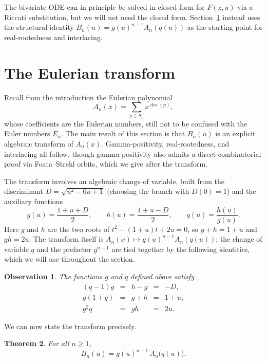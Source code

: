 \documentclass[10pt]{article}
\theoremstyle{plain}
\newtheorem{theorem}{Theorem}[section]
\newtheorem{observation}[theorem]{Observation}
\DeclareMathOperator{\des}{des}
\begin{document}
The bivariate ODE can in principle be solved in closed form for $F(z,u)$ via a Riccati substitution, but we will not need the closed form. Section~\ref{sec:transform} instead uses the structural identity $B_n(u) = g(u)^{n-1} A_n(q(u))$ as the starting point for real-rootedness and interlacing.


\section{The Eulerian transform}
\label{sec:transform}

Recall from the introduction the Eulerian polynomial
\[
	A_n(x) = \sum_{p \in S_n} x^{\des(p)},
\]
whose coefficients are the Eulerian numbers, still not to be confused with the Euler numbers $E_n$. The main result of this section is that $B_n(u)$ is an explicit algebraic transform of $A_n(x)$. Gamma-positivity, real-rootedness, and interlacing all follow, though gamma-positivity also admits a direct combinatorial proof via Foata--Strehl orbits, which we give after the transform.

The transform involves an algebraic change of variable, built from the discriminant $D = \sqrt{u^2 - 6u + 1}$ (choosing the branch with $D(0) = 1$) and the auxiliary functions
\[
	g(u) = \frac{1+u+D}{2}, \qquad h(u) = \frac{1+u-D}{2}, \qquad q(u) = \frac{h(u)}{g(u)}.
\]
Here $g$ and $h$ are the two roots of $t^2 - (1+u)t + 2u = 0$, so $g + h = 1 + u$ and $gh = 2u$. The transform itself is $A_n(x) \mapsto g(u)^{n-1} A_n(q(u))$; the change of variable $q$ and the prefactor $g^{n-1}$ are tied together by the following identities, which we will use throughout the section.

\begin{observation}
\label{obs:gq-identities}
The functions $g$ and $q$ defined above satisfy
\[
\begin{array}{rcccl}
	(q-1)g	&=&	h - g	&=&	-D,		\\
	g(1+q)	&=&	g + h	&=&	1+u,		\\
	g^2 q	&=&	gh		&=&	2u.
\end{array}
\]
\end{observation}

We can now state the transform precisely.

\begin{theorem}
\label{thm:transform}
For all $n \geq 1$,
\[
	B_n(u) = g(u)^{n-1}\, A_n\bigl(q(u)\bigr).
\]
\end{theorem}
\end{document}
